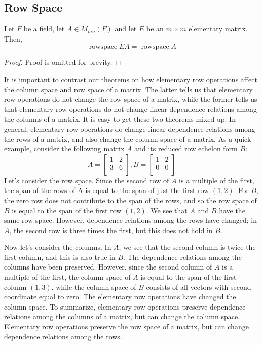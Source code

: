 \documentclass{article}
\DeclareMathOperator{\rowspace}{rowspace}
\begin{document}
\subsection{Row Space}
\begin{theorem}
  Let $F$ be a field, let $A \in M_{mn}(F)$ and let $E$ be an $m \times m$ elementary matrix. Then,
  \[
    \rowspace EA = \rowspace A
  \]
\end{theorem}
\begin{proof}
  Proof is omitted for brevity.
\end{proof}
\begin{remark}
  It is important to contrast our theorems on how elementary row operations
  affect the column space and row space of a matrix. The latter tells us that
  elementary row operations do not change the row space of a matrix, while
  the former tells us that elementary row operations do not change linear
  dependence relations among the columns of a matrix.
  It is easy to get these two theorems mixed up. In general, elementary row
  operations do change linear dependence relations among the rows of a
  matrix, and also change the column space of a matrix. As a quick example,
  consider the following matrix $A$ and its reduced row echelon form $B$:
  \[
    A =
    \begin{bmatrix}
      1 & 2\\
      3 & 6\\
    \end{bmatrix}, B =
    \begin{bmatrix}
      1 & 2\\
      0 & 0\\
    \end{bmatrix}
  \]
  Let’s consider the row space. Since the second row of $A$ is a multiple of
  the first, the span of the rows of A is equal to the span of just the first row
  $(1, 2)$. For $B$, the zero row does not contribute to the span of the rows,
  and so the row space of $B$ is equal to the span of the first row $(1, 2)$. We
  see that $A$ and $B$ have the same row space. However, dependence
  relations among the rows have changed; in $A$, the second row is three
  times the first, but this does not hold in $B$.

  Now let’s consider the columns. In $A$, we see that the second column is twice the
  first column, and this is also true in $B$. The dependence relations among the
  columns have been preserved. However, since the second column of $A$ is a
  multiple of the first, the column space of $A$ is equal to the span of the first column
  $(1, 3)$, while the column space of $B$ consists of all vectors with second coordinate
  equal to zero. The elementary row operations have changed the column space.
  To summarize, elementary row operations preserve dependence relations among
  the columns of a matrix, but can change the column space. Elementary row
  operations preserve the row space of a matrix, but can change dependence
  relations among the rows.


\end{remark}
\end{document}
